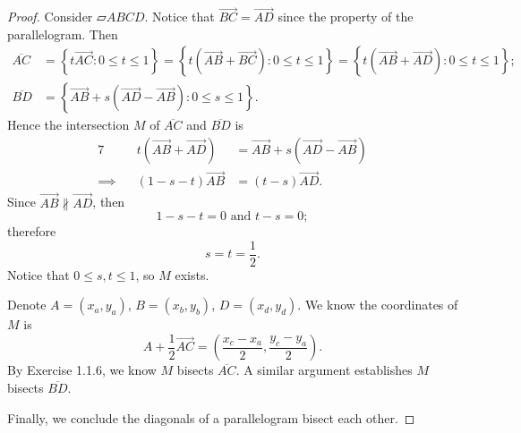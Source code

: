 \begin{Exercise}
\begin{proof}
Consider $\parallelogram A B C D$. Notice that $\overrightarrow{B C} = \overrightarrow{A D}$ since the property of the parallelogram. Then
\begin{align*}
\overline{A C} 
&= \left\{ t\overrightarrow{A C}: 0\leq t\leq 1 \right\} 
= \left\{ t\left( \overrightarrow{A B} + \overrightarrow{B C} \right): 0\leq t\leq 1 \right\}
= \left\{ t\left( \overrightarrow{A B} + \overrightarrow{A D} \right): 0\leq t\leq 1 \right\}; \\
\overline{B D} 
&= \left\{ \overrightarrow{A B} + s\left( \overrightarrow{A D} - \overrightarrow{AB} \right): 0\leq s\leq 1 \right\}.
\end{align*}
Hence the intersection $M$ of $\overline{A C}$ and $\overline{B D}$ is
\begin{alignat*}{7}
\quad&& t\left( \overrightarrow{A B} + \overrightarrow{A D} \right)
&= \overrightarrow{A B} + s\left( \overrightarrow{A D} - \overrightarrow{AB} \right) \\
\implies&& (1-s-t)\overrightarrow{A B} &= (t-s)\overrightarrow{A D}.
\end{alignat*}
Since $\overrightarrow{A B}\nparallel \overrightarrow{A D}$, then
$$
1-s-t = 0 \text{ and } t-s=0;
$$
therefore 
$$
s=t=\frac{1}{2}.
$$
Notice that $0\leq s,t \leq 1$, so $M$ exists.

Denote $A = (x_a, y_a)$, $B = (x_b, y_b)$, $D = (x_d, y_d)$.
We know the coordinates of $M$ is 
$$
A+\frac{1}{2}\overrightarrow{A C}
= \left( \frac{x_c-x_a}{2}, \frac{y_c-y_a}{2} \right).
$$
By Exercise 1.1.6, we know $M$ bisects $\overline{A C}$. A similar argument establishes $M$ bisects $\overline{B D}$.

Finally, we conclude the diagonals of a parallelogram bisect each other.
\end{proof}
\end{Exercise}